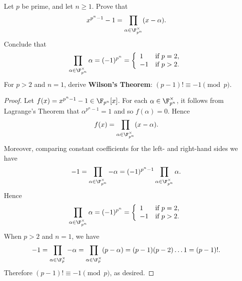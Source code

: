 \documentclass[10pt]{amsart}
\begin{document}
\begin{thm}
  Let $p$ be prime, and let $n \geq 1$.
  Prove that 
  $$x^{p^n - 1} - 1 = \prod_{\alpha \in \F_{p^n}^\times}(x - \alpha).$$
  Conclude that 
  $$\prod_{\alpha \in \F_{p^n}^\times} \alpha = (-1)^{p^n} = \left\{\begin{array}{lr}
  1 & \text{if}\ p = 2,\\
  -1 & \text{if}\ p > 2.
  \end{array}
  \right.$$
  For $p > 2$ and $n = 1$, derive {\bf Wilson's Theorem}: $(p - 1)! \equiv -1 \pmod{p}$.
  \begin{proof}
    Let $f(x) = x^{p^n - 1} - 1 \in \F_{p^n}[x]$.
    For each $\alpha \in \F_{p^n}^\times$, it follows from Lagrange's Theorem that $\alpha^{p^n - 1} = 1$ and so $f(\alpha) = 0$.
    Hence 
    $$f(x) = \prod_{\alpha \in \F_{p^n}^\times}(x - \alpha).$$
    Moreover, comparing constant coefficients for the left- and right-hand sides we have
    $$-1 = \prod_{\alpha \in \F_{p^n}^\times} -\alpha = (-1)^{p^n - 1} \prod_{\alpha \in \F_{p^n}^\times} \alpha.$$
    Hence $$\prod_{\alpha \in \F_{p^n}^\times} \alpha = (-1)^{p^n} = \left\{\begin{array}{lr}
  1 & \text{if}\ p = 2,\\
  -1 & \text{if}\ p > 2.
  \end{array}
  \right.$$
  When $p > 2$ and $n = 1$, we have
  $$-1 = \prod_{\alpha \in \F_{p}^\times} -\alpha = \prod_{\alpha \in \F_{p}^\times} (p - \alpha) = (p - 1)(p - 2)\ldots 1 = (p-1)!.$$
  Therefore $(p-1)! \equiv -1 \pmod{p}$, as desired.
  \end{proof}
\end{thm}
\end{document}
